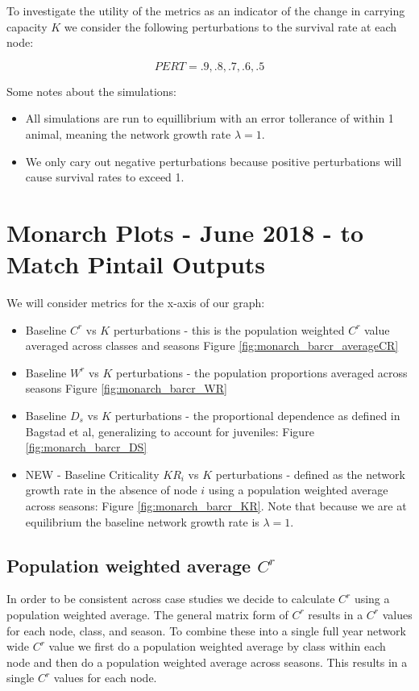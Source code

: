 \documentclass[10pt]{article}
\begin{document}
To investigate the utility of the metrics as an indicator of the change in carrying capacity $K$ we consider the following perturbations to the survival rate at each node:

\[PERT = .9, .8, .7, .6, .5\]

Some notes about the simulations:
\begin{itemize}
\item All simulations are run to equillibrium with an error tollerance of within 1 animal, meaning the network growth rate $\lambda=1$.
\item We only cary out negative perturbations because positive perturbations will cause survival rates to exceed 1.
\end{itemize}
%  


\newpage 



\section{Monarch Plots - June 2018 - to Match Pintail Outputs}

We will consider metrics for the x-axis of our graph:
\begin{itemize}
\item Baseline $C^r$ vs $K$ perturbations - this is the population weighted $C^r$ value averaged across classes and seasons Figure \ref{fig:monarch_barcr_averageCR}
\item Baseline $W^r$ vs $K$ perturbations - the population proportions averaged across seasons Figure \ref{fig:monarch_barcr_WR}
\item Baseline $D_s$ vs $K$ perturbations - the proportional dependence as defined in Bagstad et al, generalizing to account for juveniles: Figure \ref{fig:monarch_barcr_DS}
\item NEW - Baseline Criticality $KR_i$ vs $K$ perturbations - defined as the network growth rate in the absence of node $i$ using a population weighted average across seasons: Figure \ref{fig:monarch_barcr_KR}. Note that because we are at equilibrium the baseline network growth rate is $\lambda = 1$.
\end{itemize}

\newpage
\subsection{Population weighted average \texorpdfstring{$C^r$}{CR}}

In order to be consistent across case studies we decide to calculate $C^r$ using a population weighted average. The general matrix form of $C^r$ results in a $C^r$ values for each node, class, and season. To combine these into a single full year network wide $C^r$ value we first do a population weighted average by class within each node and then do a population weighted average across seasons. This results in a single $C^r$ values for each node.
\end{document}
